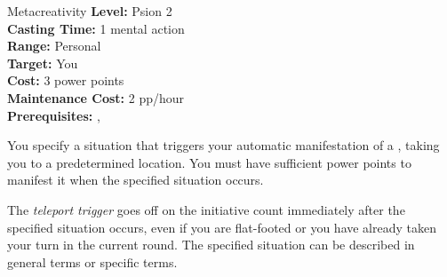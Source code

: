 {Metacreativity}
{
	\textbf{Level:}
	Psion 2\\
	\textbf{Casting Time:}
	1 mental action\\
	\textbf{Range:}
	Personal\\
	\textbf{Target:}
	You\\
	\textbf{Cost:}
	3 power points\\
	\textbf{Maintenance Cost:}
	2 pp/hour\\
	\textbf{Prerequisites:}
	, \\
}
{
	You specify a situation that triggers your automatic manifestation of a , taking you to a predetermined location. You must have sufficient power points to manifest it when the specified situation occurs.

	The \emph{teleport trigger} goes off on the initiative count immediately after the specified situation occurs, even if you are flat-footed or you have already taken your turn in the current round. The specified situation can be described in general terms or specific terms.
}